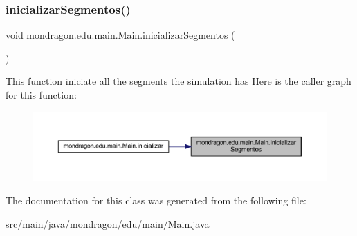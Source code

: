 \subsubsection{\texorpdfstring{inicializarSegmentos()}{inicializarSegmentos()}}
{\footnotesize\ttfamily void mondragon.\+edu.\+main.\+Main.\+inicializar\+Segmentos (\begin{DoxyParamCaption}{ }\end{DoxyParamCaption})\hspace{0.3cm}{\ttfamily [inline]}}

This function iniciate all the segments the simulation has Here is the caller graph for this function\+:\nopagebreak
\begin{figure}[H]
\begin{center}
\leavevmode
\includegraphics[width=350pt]{classmondragon_1_1edu_1_1main_1_1_main_a31f9a39c9349efab4a8addeb531d4669_icgraph}
\end{center}
\end{figure}


The documentation for this class was generated from the following file\+:\begin{DoxyCompactItemize}
\item 
src/main/java/mondragon/edu/main/Main.\+java\end{DoxyCompactItemize}
